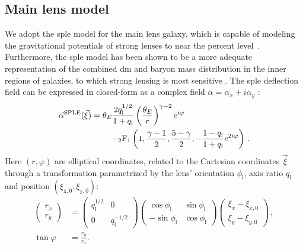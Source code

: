 \subsection{Main lens model}\label{subsec:sl-model-lens}

    
We adopt the \gls*{sple} model for the main lens galaxy, which is capable of modeling the gravitational potentials of strong lenses to near the percent level~\citep{Suyu:2008zp}. Furthermore, the \gls*{sple} model has been shown to be a more adequate representation of the combined \gls*{dm} and baryon mass distribution in the inner regions of galaxies, to which strong lensing is most sensitive \citep{Suyu:2008zp}. The \gls*{sple} deflection field can be expressed in closed-form as a complex field $\alpha = \alpha_x + i \alpha_y$ \citep{Tessore:2015baa,ORiordan:2020aa}:
\begin{equation}
\begin{split}
    \vec{\alpha}^\mathrm{SPLE}(\vec{\xi}) = \theta_E & \frac{2 q_\mathrm{l}^{1/2}}{1 + q_\mathrm{l}} \left( \frac{\theta_E}{r} \right)^{\gamma - 2} e^{i \varphi} \\
    & \cdot {}_2\mathrm{F}_1\left( 1, \frac{\gamma - 1}{2}, \frac{5 - \gamma}{2}, -\frac{1-q_\mathrm{l}}{1+q_\mathrm{l}} e^{2 i \varphi} \right) \, .
\end{split}
\end{equation}
Here $(r, \varphi)$ are elliptical coordinates, related to the Cartesian coordinates $\vec{\xi}$ through a transformation parametrized by the lens' orientation $\phi_\mathrm{l}$, axis ratio $q_\mathrm{l}$ and position $(\xi_\mathrm{x, 0}, \xi_\mathrm{y, 0})$:
\begin{align}
    \begin{pmatrix} r_x \\ r_y \end{pmatrix} &= \begin{pmatrix} q_\mathrm{l}^{1/2} & 0 \\ 0 & q_\mathrm{l}^{-1/2} \end{pmatrix} \begin{pmatrix} \cos\phi_\mathrm{l} & \sin\phi_\mathrm{l} \\ -\sin\phi_\mathrm{l} & \cos\phi_\mathrm{l} \end{pmatrix} \begin{pmatrix} \xi_x - \xi_{x, 0} \\ \xi_y - \xi_{y, 0} \end{pmatrix} \, ,\\
    \tan \varphi &= \frac{r_y}{r_x}.
\end{align}

